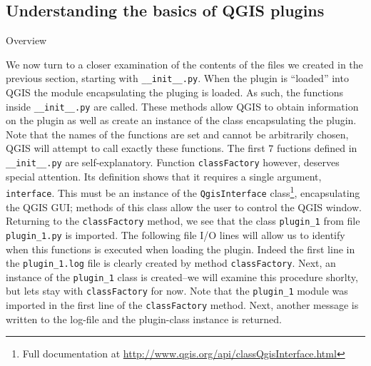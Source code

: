 \subsection{Understanding the basics of QGIS plugins}
\label{ssect:understanding_plugin_basics}
\par%
Overview
\par%
We now turn to a closer examination of the contents of the files we created in the previous section, starting with \lstinline{__init__.py}. When the plugin is ``loaded'' into QGIS the module encapsulating the pluging is loaded. As such, the functions inside \lstinline{__init__.py} are called. These methods allow QGIS to obtain information on the plugin as well as create an instance of the class encapsulating the plugin. Note that the names of the functions are set and cannot be arbitrarily chosen, QGIS will attempt to call exactly these functions. The first $7$ fuctions defined in \lstinline{__init__.py} are self-explanatory. Function \lstinline{classFactory} however, deserves special attention. Its definition shows that it requires a single argument, \lstinline{interface}. This must be an instance of the \lstinline{QgisInterface} class\footnote{Full documentation at \url{http://www.qgis.org/api/classQgisInterface.html}}, encapsulating the QGIS GUI; methods of this class allow the user to control the QGIS window. Returning to the \lstinline{classFactory} method, we see that the class \lstinline{plugin_1} from file \lstinline{plugin_1.py} is imported. The following file I/O lines will allow us to identify when this functions is executed when loading the plugin. Indeed the first line in the \lstinline{plugin_1.log} file is clearly created by method \lstinline{classFactory}. Next, an instance of the \lstinline{plugin_1} class is created--we will examine this procedure shorlty, but lets stay with \lstinline{classFactory} for now. Note that the \lstinline{plugin_1} module was imported in the first line of the \lstinline{classFactory} method. Next, another message is written to the log-file and the plugin-class instance is returned.
\par%
